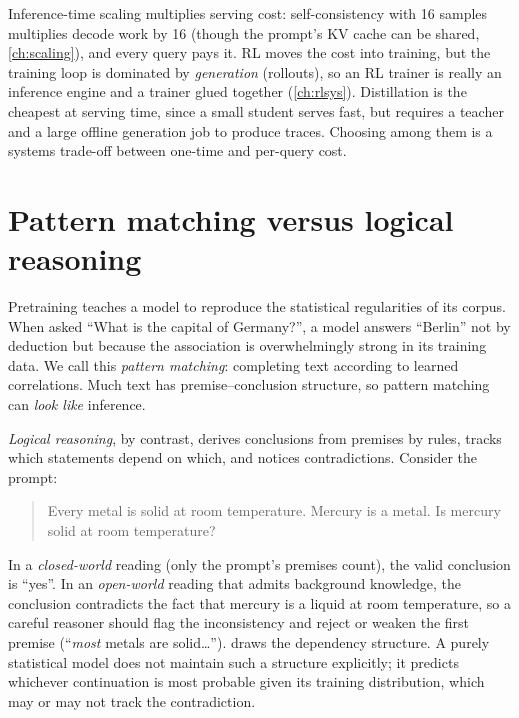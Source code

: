 \begin{systemslens}
Inference-time scaling multiplies serving cost: self-consistency with 16 samples multiplies decode work
by 16 (though the prompt's KV cache can be shared, \cref{ch:scaling}), and every query pays it. RL moves the
cost into training, but the training loop is dominated by \emph{generation} (rollouts), so an RL
trainer is really an inference engine and a trainer glued together (\cref{ch:rlsys}). Distillation is the
cheapest at serving time, since a small student serves fast, but requires a teacher and a large
offline generation job to produce traces. Choosing among them is a systems trade-off between one-time
and per-query cost.
\end{systemslens}

\section{Pattern matching versus logical reasoning}\label{sec:landscape:pattern}

Pretraining teaches a model to reproduce the statistical regularities of its corpus. When asked
``What is the capital of Germany?'', a model answers ``Berlin'' not by deduction but because the
association is overwhelmingly strong in its training data. We call this \emph{pattern matching}:
completing text according to learned correlations. Much text has premise--conclusion structure, so
pattern matching can \emph{look like} inference.

\emph{Logical reasoning}, by contrast, derives conclusions from premises by rules, tracks which
statements depend on which, and notices contradictions. Consider the prompt:
\begin{quote}\small
Every metal is solid at room temperature. Mercury is a metal. Is mercury solid at room temperature?
\end{quote}
In a \emph{closed-world} reading (only the prompt's premises count), the valid conclusion is ``yes''.
In an \emph{open-world} reading that admits background knowledge, the conclusion contradicts the fact
that mercury is a liquid at room temperature, so a careful reasoner should flag the inconsistency and
reject or weaken the first premise (``\emph{most} metals are solid\dots''). 
draws the dependency structure. A purely statistical model does not maintain such a structure explicitly;
it predicts whichever continuation is most probable given its training distribution, which may or may
not track the contradiction.

